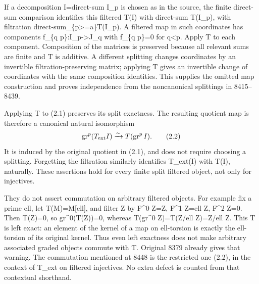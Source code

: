 \documentclass[11pt]{article}
\begin{document}
If a decomposition I\allowbreak{}=direct-sum I\_\allowbreak{}p is chosen as in the source,\allowbreak{} the finite direct-sum comparison identifies this filtered T(I)\allowbreak{} with direct-sum T(I\_\allowbreak{}p)\allowbreak{},\allowbreak{} with filtration direct-sum\_\allowbreak{}\{p>\allowbreak{}=a\}T(I\_\allowbreak{}p)\allowbreak{}. A filtered map in such coordinates has components f\_\allowbreak{}\{q p\}:\allowbreak{}I\_\allowbreak{}p\allowbreak{}->J\_\allowbreak{}q with f\_\allowbreak{}\{q p\}\allowbreak{}=0 for q\textless p. Apply T to each component. Composition of the matrices is preserved because all relevant sums are finite and T is additive. A different splitting changes coordinates by an invertible filtration-preserving matrix; applying T gives an invertible change of coordinates with the same composition identities. This supplies the omitted map construction and proves independence from the noncanonical splittings in 8415–\allowbreak{}8439.

Applying T to (2.1)\allowbreak{} preserves its split exactness. The resulting quotient map is therefore a canonical natural isomorphism \[
 \operatorname{gr}^p(T_{\rm ext}I)
       \xrightarrow{\sim}T(\operatorname{gr}^p I).            \tag{2.2}
\] It is induced by the original quotient in (2.1)\allowbreak{},\allowbreak{} and does not require choosing a splitting. Forgetting the filtration similarly identifies T\_\allowbreak{}ext(I)\allowbreak{} with T(I)\allowbreak{},\allowbreak{} naturally. These assertions hold for every finite split filtered object,\allowbreak{} not only for injectives.

They do not assert commutation on arbitrary filtered objects. For example fix a prime ell,\allowbreak{} let T(M)\allowbreak{}\allowbreak{}=M[ell]\allowbreak{},\allowbreak{} and filter Z by F\^{}0 Z\allowbreak{}=Z,\allowbreak{} F\^{}1 Z\allowbreak{}=ell Z,\allowbreak{} F\^{}2 Z\allowbreak{}=0. Then T(Z)\allowbreak{}\allowbreak{}=0,\allowbreak{} so gr\textasciicircum{}0(T(Z)\allowbreak{})\allowbreak{}\allowbreak{}=0,\allowbreak{} whereas T(gr\^{}0 Z)\allowbreak{}\allowbreak{}=T(Z/\allowbreak{}ell Z)\allowbreak{}\allowbreak{}=Z/\allowbreak{}ell Z. This T is left exact:\allowbreak{} an element of the kernel of a map on ell-torsion is exactly the ell-torsion of its original kernel. Thus even left exactness does not make arbitrary associated graded objects commute with T. Original 8379 already gives that warning. The commutation mentioned at 8448 is the restricted one (2.2)\allowbreak{},\allowbreak{} in the context of T\_\allowbreak{}ext on filtered injectives. No extra defect is counted from that contextual shorthand.
\end{document}
